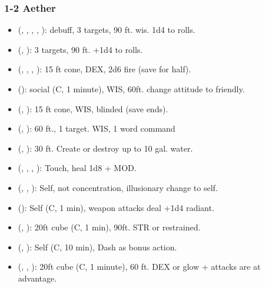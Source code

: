 \subsubsection{1-2 Aether}
\begin{itemize}
	\item {} (, , , , ): debuff, 3 targets, 90 ft. wis. \textminus 1d4 to rolls.
	\item {} (, ): 3 targets, 90 ft. +1d4 to rolls.
	\item {} (, , , ): 15 ft cone, DEX, 2d6 fire (save for half).
	\item {} (): social (C, 1 minute), WIS, 60ft. change attitude to friendly. 
	\item {} (, ): 15 ft cone, WIS, blinded (save ends).
	\item {} (, ): 60 ft., 1 target. WIS, 1 word command
	\item {} (, ): 30 ft. Create or destroy up to 10 gal. water.
	\item {} (, , , ): Touch, heal 1d8 + MOD.
	\item {} (, , ): Self, not concentration, illusionary change to self.
	\item {} (): Self (C, 1 min), weapon attacks deal +1d4 radiant.
	\item {} (, ): 20ft cube (C, 1 min), 90ft. STR or restrained.
	\item {} (, ): Self (C, 10 min), Dash as bonus action.
	\item {} (, , ): 20ft cube (C, 1 minute), 60 ft. DEX or glow + attacks are at advantage.

\end{itemize}
